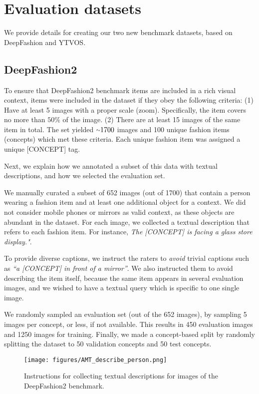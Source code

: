\documentclass[runningheads]{llncs}
\newcommand{\tildeapprox}{{\raise.17ex\hbox{$\scriptstyle\sim$}}}
\newcommand{\concept}{[CONCEPT]}
\begin{document}
\section{Evaluation datasets}
\label{sec_datasets_suppl}
We provide details for creating our two new benchmark datasets, based on DeepFashion and YTVOS.

\subsection{DeepFashion2}
\label{sec_deepfashion_suppl}

To ensure that DeepFashion2 benchmark items are included in a rich visual context, items were included in the dataset if they obey the following criteria: (1) Have at least 5 images with a proper scale (zoom). Specifically, the item covers no more than $50\%$ of the image. (2) There are at least 15 images of the same item in total. The set yielded $\tildeapprox 1700$ images and 100 unique fashion items (concepts) which met these criteria. Each unique fashion item was assigned a unique \concept{} tag.

Next, we explain how we annotated a subset of this data with textual descriptions, and how we selected the evaluation set.


We manually curated a subset of 652 images (out of 1700) that contain a person wearing a fashion item and at least one additional object for a context.
We did not consider mobile phones or mirrors as valid context, as these objects are abundant in the dataset. For each image, we collected a textual description that refers to each fashion item. For instance, \textit{The \concept{} is facing a glass store display."}.

To provide diverse captions, we instruct the raters to \textit{avoid} trivial captions such as \textit{``a \concept{} in front of a mirror''}. We also instructed them to avoid describing the item itself, because the same item appears in several evaluation images, and we wished to have a textual query which is specific to one single image.

We randomly sampled an evaluation set (out of the 652 images), by sampling 5 images per concept, or less, if not available.
This results in 450 evaluation images and 1250 images for training. Finally, we made a concept-based split by randomly splitting the dataset to 50 validation concepts and 50 test concepts.

\begin{figure}[htbp]
\label{AMT_describe_person}
    \centering
    \texttt{[image: figures/AMT\_describe\_person.png]} \hspace{-10pt}
    \vspace{-10pt}
    \caption{
Instructions for collecting textual descriptions for images of the DeepFashion2 benchmark.
    }
    \label{fig_AMT_describe_person}
    \vspace{-10pt}
\end{figure}
\end{document}
